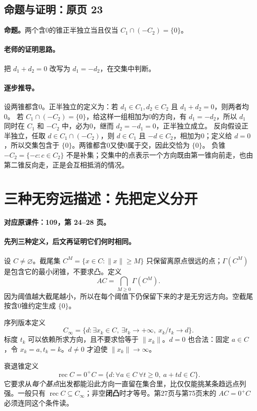 \documentclass[11pt,a4paper]{article}
\theoremstyle{definition}\newtheorem{definition}{定义}\newtheorem{example}{例}
\begin{document}
\subsection{命题与证明：原页 23}

\textbf{命题。}两个含0的锥正半独立当且仅当 $C_1\cap(-C_2)=\{0\}$。

\paragraph{老师的证明思路。}把 $d_1+d_2=0$ 改写为 $d_1=-d_2$，在交集中判断。

\paragraph{逐步推导。}
设两锥都含0。正半独立的定义为：若 $d_1\in C_1,d_2\in C_2$ 且 $d_1+d_2=0$，则两者均0。
若 $C_1\cap(-C_2)=\{0\}$，给这样一组相加为0的方向，有 $d_1=-d_2$，所以 $d_1$ 同时在 $C_1$ 和 $-C_2$ 中，必为0，继而 $d_2=-d_1=0$，正半独立成立。
反向假设正半独立，任取 $d\in C_1\cap(-C_2)$，则 $d\in C_1$ 且 $-d\in C_2$，相加为0；定义给 $d=0$，所以交集包含于 $\{0\}$。两锥都含0又使0属于交，因此交恰为 $\{0\}$。
负锥 $-C_2=\{-c:c\in C_2\}$ 不是补集；交集中的点表示一个方向既由第一锥向前走，也由第二锥反向走，正是会互相抵消的情况。


\clearpage\section{三种无穷远描述：先把定义分开}\label{g:109:24}

\textbf{对应原课件：109，第 24--28 页。}


\paragraph{先列三种定义，后文再证明它们何时相同。}
设 $C\ne\varnothing$。截尾集 $C^M=\{x\in C:\|x\|\ge M\}$ 只保留离原点很远的点；$\Gamma(C^M)$ 是包含它的最小闭锥，不要求凸。定义
\[AC=\bigcap_{M\ge0}\Gamma(C^M).
\]
因为阈值越大截尾越小，所以在每个阈值下仍保留下来的才是无穷远方向。空截尾按含0锥约定生成 $\{0\}$。

序列版本定义
\[C_\infty=\{d:\exists x_k\in C,\ \exists t_k\to+\infty,\ x_k/t_k\to d\}.
\]
标度 $t_k$ 可以依赖所求方向，且不要求恰等于 $\|x_k\|$。$d=0$ 也合法：固定 $a\in C$，令 $x_k=a,t_k=k$。$d\ne0$ 才迫使 $\|x_k\|\to\infty$。

衰退锥定义
\[\operatorname{rec}C=0^+C=\{d:\forall a\in C\ \forall t\ge0,\ a+td\in C\}.
\]
它要求从\emph{每个基点}出发都能沿此方向一直留在集合里，比仅仅能挑某条趋远点列强。一般只有 $\operatorname{rec}C\subseteq C_\infty$；非空\textbf{闭凸}时才等号。第27页与第75页末的 $AC=0^+C$ 必须连同这个条件读。
\end{document}
